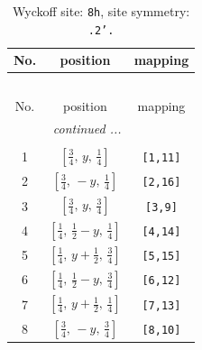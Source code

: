 \documentclass[fleqn,8pt]{jsarticle}
\begin{document}
\begin{longtable}{ccc}
\caption{Wyckoff site: {\tt 8h}, site symmetry: {\tt .2'.}}
 \\
 \hline \hline
No. & position & mapping \\ \hline \endfirsthead

\multicolumn{2}{l}{\tablename\ \thetable{}} \\
 \hline \hline
No. & position & mapping \\ \hline \endhead

 \hline \hline
\multicolumn{2}{r}{\footnotesize\it continued ...} \\ \endfoot

 \hline \hline
\multicolumn{2}{r}{} \\ \endlastfoot

1 & $\left[ \frac{3}{4},\, y,\, \frac{1}{4} \right]$ & {\tt [1,11]} \\ \hline
2 & $\left[ \frac{3}{4},\, - y,\, \frac{1}{4} \right]$ & {\tt [2,16]} \\ \hline
3 & $\left[ \frac{3}{4},\, y,\, \frac{3}{4} \right]$ & {\tt [3,9]} \\ \hline
4 & $\left[ \frac{1}{4},\, \frac{1}{2} - y,\, \frac{1}{4} \right]$ & {\tt [4,14]} \\ \hline
5 & $\left[ \frac{1}{4},\, y + \frac{1}{2},\, \frac{3}{4} \right]$ & {\tt [5,15]} \\ \hline
6 & $\left[ \frac{1}{4},\, \frac{1}{2} - y,\, \frac{3}{4} \right]$ & {\tt [6,12]} \\ \hline
7 & $\left[ \frac{1}{4},\, y + \frac{1}{2},\, \frac{1}{4} \right]$ & {\tt [7,13]} \\ \hline
8 & $\left[ \frac{3}{4},\, - y,\, \frac{3}{4} \right]$ & {\tt [8,10]} \\
\end{longtable}
\renewcommand{\arraystretch}{1.2}
\end{document}
